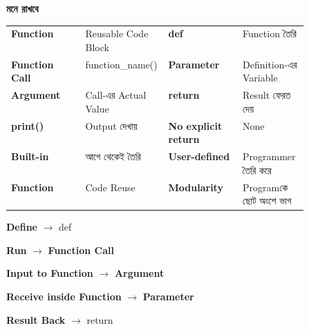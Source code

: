 \begin{rememberbox}

\textbf{\color{deepOrange}মনে রাখবে}

\begin{tabularx}
{\linewidth}
{
>{\bfseries\RaggedRight\arraybackslash}p{0.25\linewidth}
Y
>{\bfseries\RaggedRight\arraybackslash}p{0.25\linewidth}
Y
}

Function
&
Reusable Code Block
&
\textenglish{\ttfamily def}
&
Function তৈরি
\\[0.5mm]

Function Call
&
\textenglish{\ttfamily function\_name()}
&
Parameter
&
Definition-এর Variable
\\[0.5mm]

Argument
&
Call-এর Actual Value
&
\textenglish{\ttfamily return}
&
Result ফেরত দেয়
\\[0.5mm]

\textenglish{\ttfamily print()}
&
Output দেখায়
&
No explicit return
&
\textenglish{\ttfamily None}
\\[0.5mm]

Built-in
&
আগে থেকেই তৈরি
&
User-defined
&
Programmer তৈরি করে
\\[0.5mm]

Function
&
Code Reuse
&
Modularity
&
Programকে ছোট অংশে ভাগ
\\

\end{tabularx}

\medskip

\begin{center}

\textbf{Define}
\(\longrightarrow\)
\textenglish{\ttfamily def}

\qquad

\textbf{Run}
\(\longrightarrow\)
\textbf{Function Call}

\medskip

\textbf{Input to Function}
\(\longrightarrow\)
\textbf{Argument}

\qquad

\textbf{Receive inside Function}
\(\longrightarrow\)
\textbf{Parameter}

\medskip

\textbf{Result Back}
\(\longrightarrow\)
\textenglish{\ttfamily return}

\end{center}

\end{rememberbox}

\small


